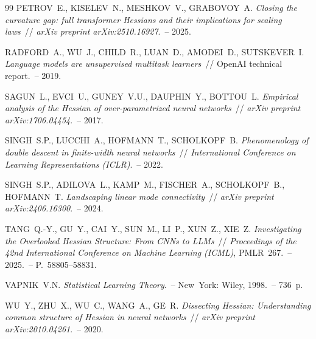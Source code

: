\documentclass[11pt]{ubs}
\begin{document}
\begin{thebibliography}{99}
{\MakeUppercase{Petrov~E., Kiselev~N., Meshkov~V., Grabovoy~A.}}
\textit{Closing the curvature gap: full transformer Hessians and their implications for scaling laws}~//
\emph{arXiv preprint arXiv:2510.16927}.~-- 2025.

{\MakeUppercase{Radford~A., Wu~J., Child~R., Luan~D., Amodei~D., Sutskever~I.}}
\textit{Language models are unsupervised multitask learners}~//
OpenAI technical report.~-- 2019.

{\MakeUppercase{Sagun~L., Evci~U., Guney~V.U., Dauphin~Y., Bottou~L.}}
\textit{Empirical analysis of the Hessian of over-parametrized neural networks}~//
\emph{arXiv preprint arXiv:1706.04454}.~-- 2017.

{\MakeUppercase{Singh~S.P., Lucchi~A., Hofmann~T., Scholkopf~B.}}
\textit{Phenomenology of double descent in finite-width neural networks}~//
\emph{International Conference on Learning Representations (ICLR)}.~-- 2022.

{\MakeUppercase{Singh~S.P., Adilova~L., Kamp~M., Fischer~A., Scholkopf~B., Hofmann~T.}}
\textit{Landscaping linear mode connectivity}~//
\emph{arXiv preprint arXiv:2406.16300}.~-- 2024.

{\MakeUppercase{Tang~Q.-Y., Gu~Y., Cai~Y., Sun~M., Li~P., Xun~Z., Xie~Z.}}
\textit{Investigating the Overlooked Hessian Structure: From CNNs to LLMs}~//
\emph{Proceedings of the 42nd International Conference on Machine Learning (ICML)}, PMLR~267.~-- 2025.~-- P.~58805--58831.

{\MakeUppercase{Vapnik~V.N.}}
\textit{Statistical Learning Theory}.~-- New~York: Wiley, 1998.~-- 736~p.

{\MakeUppercase{Wu~Y., Zhu~X., Wu~C., Wang~A., Ge~R.}}
\textit{Dissecting Hessian: Understanding common structure of Hessian in neural networks}~//
\emph{arXiv preprint arXiv:2010.04261}.~-- 2020.

\end{thebibliography}

\makeenginfo
\makeauxinfo
\end{document}
